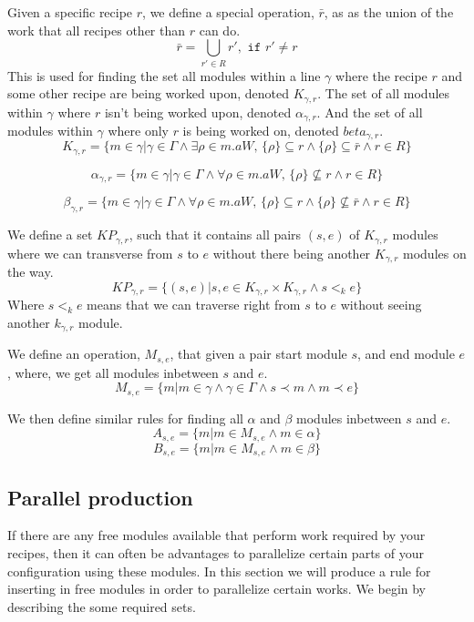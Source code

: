 Given a specific recipe $r$, we define a special operation, $\bar{r}$, as as the union of the work that all recipes other than $r$ can do. 
\[\bar{r} = \bigcup_{r' \in R}r', \texttt{ if } r' \neq r\]
This is used for finding the set all modules within a line $\gamma$ where the recipe $r$ and some other recipe are being worked upon, denoted $K_{\gamma ,r}$. The set of all modules within $\gamma$ where $r$ isn't being worked upon, denoted $\alpha_{\gamma ,r}$. And the set of all modules within $\gamma$ where only $r$ is being worked on, denoted $beta_{\gamma ,r}$. 
\[K_{\gamma ,r} = \{m \in \gamma | \gamma \in \Gamma \land \exists \rho \in m.aW,\, \{\rho\} \subseteq r \land \{\rho\} \subseteq \bar{r} \land r \in R\}\]

\[\alpha_{\gamma ,r}  = \{m \in \gamma | \gamma \in \Gamma \land \forall \rho \in m.aW,\, \{\rho\} \nsubseteq r \land r \in R\}\]

\[\beta_{\gamma ,r}  = \{m \in \gamma | \gamma \in \Gamma \land \forall \rho \in m.aW,\, \{\rho\} \subseteq r \land \{\rho\} \nsubseteq \bar{r} \land r \in R\}\]


We define a set $KP_{\gamma ,r}$, such that it contains all pairs $(s, e)$ of $K_{\gamma ,r}$ modules where we can transverse from $s$ to $e$ without there being another $K_{\gamma, r}$ modules on the way.
\[KP_{\gamma ,r} = \{(s, e)| {s, e} \in K_{\gamma ,r} \times K_{\gamma ,r} \land s <_k  e\}\]
Where $s <_k e$ means that we can traverse right from $s$ to $e$ without seeing another $k_{\gamma, r}$ module. 

We define an operation, $M_{s,e}$, that given a pair start module $s$, and end module  $e$, where, we get all modules inbetween $s$ and $e$.
\[M_{s,e} = \{m | m \in \gamma \land \gamma \in \Gamma \land s \prec m \land m \prec e\}\]

We then define similar rules for finding all $\alpha$ and $\beta$ modules inbetween $s$ and $e$.
\[A_{s,e} = \{m |m \in M_{s,e} \land m \in \alpha\}\]
\[B_{s,e} = \{m |m \in M_{s,e} \land m \in \beta\}\]

\subsection{Parallel production}
If there are any free modules available that perform work required by your recipes, then it can often be advantages to parallelize certain parts of your configuration using these modules. In this section we will produce a rule for inserting in free modules in order to parallelize certain works. We begin by describing the some required sets.

